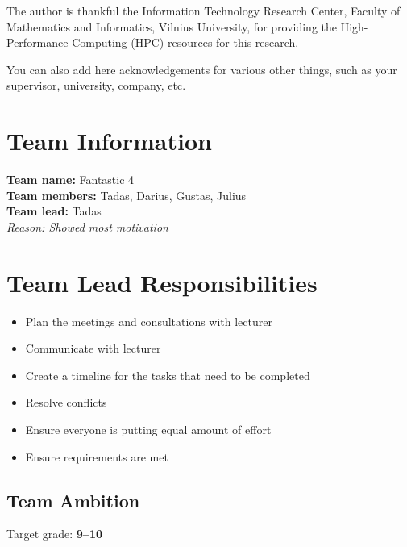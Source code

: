 \documentclass[]{VUMIFTemplateClass}
\begin{document}

\onehalfspacing


The author is thankful the Information Technology Research Center, Faculty of Mathematics and Informatics, Vilnius University, for providing the High-Performance Computing (HPC) resources for this research.

You can also add here acknowledgements for various other things, such as your supervisor, university, company, etc.


\section*{Team Information}
\textbf{Team name:} Fantastic 4 \\[4pt]
\textbf{Team members:} Tadas, Darius, Gustas, Julius \\[4pt]
\textbf{Team lead:} Tadas \\[2pt]
\textit{Reason: Showed most motivation} \\[8pt]

\section*{Team Lead Responsibilities}
\begin{itemize}
    \item Plan the meetings and consultations with lecturer
    \item Communicate with lecturer
    \item Create a timeline for the tasks that need to be completed
    \item Resolve conflicts
    \item Ensure everyone is putting equal amount of effort
    \item Ensure requirements are met
\end{itemize}

\subsection*{Team Ambition}
Target grade: \textbf{9--10}
\end{document}
